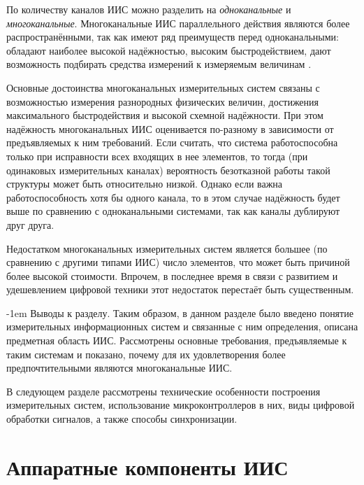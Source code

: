 \documentclass[a4paper, 14pt, titlepage]{extarticle}
\makeatletter
\newcommand{\term}[1]{\emph{#1}}
\let\oldsection\section
\renewcommand{\section}{\newpage\oldsection}
\renewcommand{\paragraph}{%
    \@startsection{paragraph}{4}%
    {\parindent}{\z@}{-1em}%
    {\normalfont\normalsize\bfseries}%
  }
\makeatother
\begin{document}
  По количеству каналов ИИС можно разделить на \term{одноканальные} и \term{многоканальные}. Многоканальные ИИС
  параллельного действия являются более распространёнными, так как имеют ряд преимуществ перед
  одноканальными: обладают наиболее высокой надёжностью, высоким быстродействием, дают возможность
  подбирать средства измерений к измеряемым величинам
  \cite[с.~171]{rannev-iis}.

  Основные достоинства многоканальных измерительных систем связаны с возможностью измерения
  разнородных физических величин, достижения
  максимального быстродействия и высокой схемной надёжности. При этом надёжность многоканальных ИИС
  оценивается по-разному в зависимости от предъявляемых к ним требований. Если считать, что система
  работоспособна только при исправности всех входящих в нее элементов, то тогда (при одинаковых
  измерительных каналах) вероятность безотказной работы такой структуры может быть относительно
  низкой. Однако если важна работоспособность хотя бы одного канала, то в этом случае надёжность
  будет выше по сравнению с одноканальными системами, так как каналы дублируют друг друга.

  Недостатком многоканальных измерительных систем является большее (по сравнению с
  другими типами ИИС) число элементов, что может быть причиной более высокой стоимости. Впрочем, в
  последнее время в связи с развитием и удешевлением цифровой техники \cite{rathore-digital} этот недостаток
  перестаёт быть существенным.



  \paragraph{Выводы к разделу.}
  Таким образом, в данном разделе было введено понятие измерительных информационных
  систем и связанные с ним определения, описана предметная область ИИС. Рассмотрены
  основные требования, предъявляемые к таким системам и показано, почему для их удовлетворения более
  предпочтительными являются многоканальные ИИС.

  В следующем разделе рассмотрены технические особенности построения измерительных систем,
  использование микроконтроллеров в них, виды цифровой обработки сигналов, а также способы
  синхронизации.

  \section{Аппаратные компоненты ИИС}\label{sec:hardware}
\end{document}
